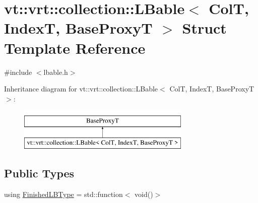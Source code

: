 \hypertarget{structvt_1_1vrt_1_1collection_1_1_l_bable}{}\section{vt\+:\+:vrt\+:\+:collection\+:\+:L\+Bable$<$ ColT, IndexT, Base\+ProxyT $>$ Struct Template Reference}
\label{structvt_1_1vrt_1_1collection_1_1_l_bable}


{\ttfamily \#include $<$lbable.\+h$>$}

Inheritance diagram for vt\+:\+:vrt\+:\+:collection\+:\+:L\+Bable$<$ ColT, IndexT, Base\+ProxyT $>$\+:\begin{figure}[H]
\begin{center}
\leavevmode
\includegraphics[height=2.000000cm]{structvt_1_1vrt_1_1collection_1_1_l_bable}
\end{center}
\end{figure}
\subsection*{Public Types}
\begin{DoxyCompactItemize}
\item 
using \hyperlink{structvt_1_1vrt_1_1collection_1_1_l_bable_a27cc10ccbf93ad3d794998c79f710a5a}{Finished\+L\+B\+Type} = std\+::function$<$ void()$>$
\end{DoxyCompactItemize}
